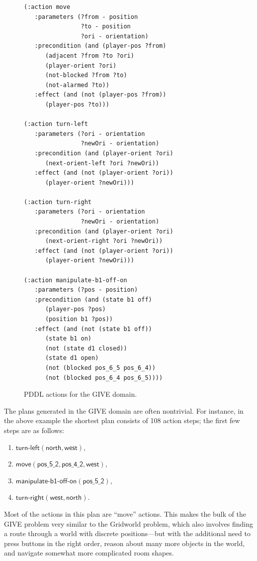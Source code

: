 \begin{figure}[t]
{\small%
\begin{verbatim}
(:action move
   :parameters (?from - position
                ?to - position
                ?ori - orientation)
   :precondition (and (player-pos ?from) 
      (adjacent ?from ?to ?ori) 
      (player-orient ?ori)
      (not-blocked ?from ?to)
      (not-alarmed ?to))
   :effect (and (not (player-pos ?from))
      (player-pos ?to)))

(:action turn-left
   :parameters (?ori - orientation
                ?newOri - orientation)
   :precondition (and (player-orient ?ori)
      (next-orient-left ?ori ?newOri))
   :effect (and (not (player-orient ?ori))
      (player-orient ?newOri)))

(:action turn-right
   :parameters (?ori - orientation
                ?newOri - orientation)
   :precondition (and (player-orient ?ori)
      (next-orient-right ?ori ?newOri))
   :effect (and (not (player-orient ?ori))
      (player-orient ?newOri)))

(:action manipulate-b1-off-on
   :parameters (?pos - position)
   :precondition (and (state b1 off)
      (player-pos ?pos)
      (position b1 ?pos))
   :effect (and (not (state b1 off))
      (state b1 on)
      (not (state d1 closed))
      (state d1 open) 
      (not (blocked pos_6_5 pos_6_4))
      (not (blocked pos_6_4 pos_6_5))))
\end{verbatim}}%
\caption{PDDL actions for the GIVE domain.}
\label{fig:give-planning}
\end{figure}

The plans generated in the GIVE domain are often nontrivial. For instance,
in the above example the shortest plan consists of 108 action steps; the
first few steps are as follows:
%
\begin{enumerate}
\item $\mathsf{turn}\textsf{-}\mathsf{left}(\mathsf{north},
\mathsf{west})$,
\item $\mathsf{move}(\mathsf{pos\_5\_2}, \mathsf{pos\_4\_2}, \mathsf{west})$,
\item $\mathsf{manipulate}\textsf{-}\mathsf{b1}\textsf{-}\mathsf{off}\textsf{-}\mathsf{on}(\mathsf{pos\_5\_2})$,
\item $\mathsf{turn}\textsf{-}\mathsf{right}(\mathsf{west}, \mathsf{north})$.
\end{enumerate}

Most of the actions in this plan are ``move'' actions.  This makes the
bulk of the GIVE problem very similar to the Gridworld problem, which
also involves finding a route through a world with discrete
positions---but with the additional need to press buttons in the right
order, reason about many more objects in the world, and navigate
somewhat more complicated room shapes.

